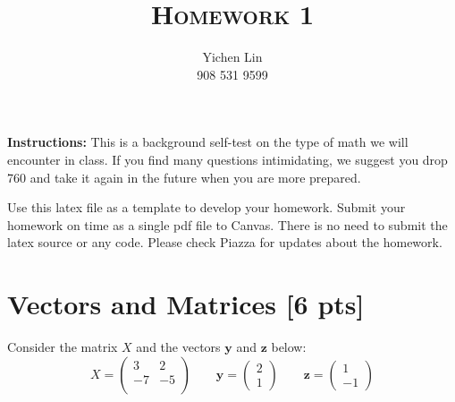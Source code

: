 \documentclass[a4paper]{article}
\title{\textsc{Homework 1}} %
\author{
	{Yichen Lin} \\
	{908 531 9599}\\
}
\date{}
\theoremstyle{definition}
\begin{document}
	
	\maketitle 
	
	
	\textbf{Instructions:} 
	This is a background self-test on the type of math we will encounter in class. If you find many questions intimidating, we suggest you drop 760 and take it again in the future when you are more prepared.
	
	Use this latex file as a template to develop your homework.
	Submit your homework on time as a single pdf file to Canvas.
	There is no need to submit the latex source or any code.
	Please check Piazza for updates about the homework.
	
	
	\section{Vectors and Matrices [6 pts]}
	Consider the matrix $X$ and the vectors $\mathbf{y}$ and $\textbf{z}$ below:
	$$
	X = \begin{pmatrix}
		3 & 2 \\ -7 & -5 \\
	\end{pmatrix}
	\qquad \mathbf{y} = \begin{pmatrix}
		2 \\ 1
	\end{pmatrix} \qquad \mathbf{z} = \begin{pmatrix}
		1 \\ -1
	\end{pmatrix}
	$$
\end{document}
